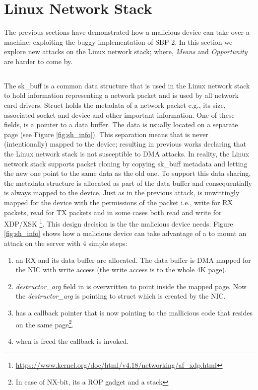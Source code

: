 \section{Linux Network Stack}\label{sec:linux_net}

The previous sections have demonstrated how a malicious device can take over a machine; exploiting the buggy implementation of SBP-2. In this section we explore new attacks on the Linux network stack; where, \textit{Means} and \textit{Opportunity} are harder to come by. 
\subsection{\shinfo}
The sk\_buff is a common data structure that is used in the Linux network stack to hold information  representing a network packet and is used by all network card drivers. Struct \skb holds the metadata of a network packet e.g., its size, associated socket and device and other important information. One of these fields, is a pointer to a data buffer. The data is usually located on a separate page (see Figure \ref{fig:sh_info}). This  separation means that \skb is never (intentionally) mapped to the device; resulting in previous works \cite{thunder} declaring that the Linux network stack is not susceptible to DMA attacks. In reality, the Linux network stack supports packet cloning by copying sk\_buff metadata and letting the new one point to the same data as the old one\cite{drivers2005linux}. To support this data sharing, the \shinfo metadata structure is allocated as part of the data buffer and consequentially is always mapped to the device. Just as in the previous attack, \shinfo is unwittingly mapped for the device with the permissions of the packet i.e., write for RX packets, read for TX packets and in some cases both read and write for XDP/XSK \footnote{\url{https://www.kernel.org/doc/html/v4.18/networking/af_xdp.html}}. This design decision is the \oportunity the malicious device needs. Figure \ref{fig:sh_info} shows how a malicious device can take advantage of a \shinfo to mount an attack on the server with 4 simple steps:
\begin{enumerate}[label=(\alph*)]
    \item an RX \skb and its data buffer are allocated. The data buffer is DMA mapped for the NIC with write access (the write access is to the whole 4K page). 
    \item \textit{destructor\_arg} field in \shinfo is overwritten to point inside the mapped page. Now the \textit{destructor\_arg} is pointing to struct \uarg which is created by the NIC.
    \item \uarg has a callback pointer that is now pointing to the mallicious code that resides on the same page\footnote{In case of NX-bit, its a ROP gadget and a stack}.
    \item when \skb is freed the callback is invoked.
\end{enumerate}
